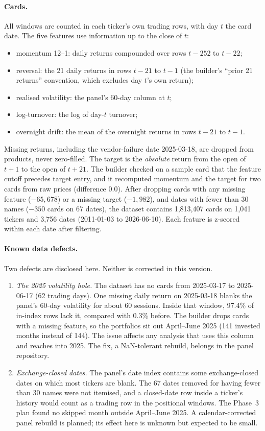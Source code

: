 \documentclass[11pt]{article}
\begin{document}
\paragraph{Cards.} All windows are counted in each ticker's own trading rows, with day $t$ the card date. The five features use information up to the close of $t$:
\begin{itemize}
\item momentum 12--1: daily returns compounded over rows $t-252$ to $t-22$;
\item reversal: the 21 daily returns in rows $t-21$ to $t-1$ (the builder's ``prior 21 returns'' convention, which excludes day $t$'s own return);
\item realised volatility: the panel's 60-day column at $t$;
\item log-turnover: the log of day-$t$ turnover;
\item overnight drift: the mean of the overnight returns in rows $t-21$ to $t-1$.
\end{itemize}
Missing returns, including the vendor-failure date 2025-03-18, are dropped from products, never zero-filled. The target is the \emph{absolute} return from the open of $t+1$ to the open of $t+21$. The builder checked on a sample card that the feature cutoff precedes target entry, and it recomputed momentum and the target for two cards from raw prices (difference 0.0). After dropping cards with any missing feature ($-65{,}678$) or a missing target ($-1{,}982$), and dates with fewer than 30 names ($-350$ cards on 67 dates), the dataset contains 1,813,407 cards on 1,041 tickers and 3,756 dates (2011-01-03 to 2026-06-10). Each feature is z-scored within each date after filtering.

\paragraph{Known data defects.} Two defects are disclosed here. Neither is corrected in this version.
\begin{enumerate}
\item \emph{The 2025 volatility hole.} The dataset has no cards from 2025-03-17 to 2025-06-17 (62 trading days). One missing daily return on 2025-03-18 blanks the panel's 60-day volatility for about 60 sessions. Inside that window, 97.4\% of in-index rows lack it, compared with 0.3\% before. The builder drops cards with a missing feature, so the portfolios sit out April--June 2025 (141 invested months instead of 144). The issue affects any analysis that uses this column and reaches into 2025. The fix, a NaN-tolerant rebuild, belongs in the panel repository.
\item \emph{Exchange-closed dates.} The panel's date index contains some exchange-closed dates on which most tickers are blank. The 67 dates removed for having fewer than 30 names were not itemised, and a closed-date row inside a ticker's history would count as a trading row in the positional windows. The Phase~3 plan found no skipped month outside April--June 2025. A calendar-corrected panel rebuild is planned; its effect here is unknown but expected to be small.
\end{enumerate}
\end{document}
